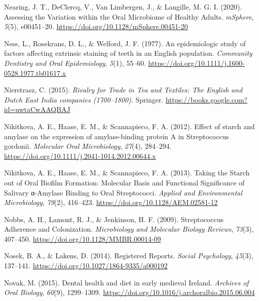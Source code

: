 \documentclass[
  letterpaper,
]{book}
\newlength{\cslhangindent}
\newlength{\cslentryspacingunit} %
\newenvironment{CSLReferences}[2] %
 {%
  \setlength{\parindent}{0pt}
  \ifodd #1
  \let\oldpar\par
  \def\par{\hangindent=\cslhangindent\oldpar}
  \fi
  \setlength{\parskip}{#2\cslentryspacingunit}
 }%
 {}
\begin{document}
\begin{CSLReferences}{1}{0}
\leavevmode{}%
Nearing, J. T., DeClercq, V., Van Limbergen, J., \& Langille, M. G. I.
(2020). Assessing the {Variation} within the {Oral Microbiome} of
{Healthy Adults}. \emph{mSphere}, \emph{5}(5), e00451--20.
\url{https://doi.org/10.1128/mSphere.00451-20}

\leavevmode{}%
Ness, L., Rosekrans, D. L., \& Welford, J. F. (1977). An epidemiologic
study of factors affecting extrinsic staining of teeth in an {English}
population. \emph{Community Dentistry and Oral Epidemiology},
\emph{5}(1), 55--60.
\url{https://doi.org/10.1111/j.1600-0528.1977.tb01617.x}

\leavevmode{}%
Nierstrasz, C. (2015). \emph{Rivalry for {Trade} in {Tea} and
{Textiles}: {The English} and {Dutch East India} companies
(1700--1800)}. {Springer}.
\url{https://books.google.com?id=uwtaCwAAQBAJ}

\leavevmode{}%
Nikitkova, A. E., Haase, E. M., \& Scannapieco, F. A. (2012). Effect of
starch and amylase on the expression of amylase-binding protein {A} in
{Streptococcus} gordonii. \emph{Molecular Oral Microbiology},
\emph{27}(4), 284--294.
\url{https://doi.org/10.1111/j.2041-1014.2012.00644.x}

\leavevmode{}%
Nikitkova, A. E., Haase, E. M., \& Scannapieco, F. A. (2013). Taking the
{Starch} out of {Oral Biofilm Formation}: {Molecular Basis} and
{Functional Significance} of {Salivary} α-{Amylase Binding} to {Oral
Streptococci}. \emph{Applied and Environmental Microbiology},
\emph{79}(2), 416--423. \url{https://doi.org/10.1128/AEM.02581-12}

\leavevmode{}%
Nobbs, A. H., Lamont, R. J., \& Jenkinson, H. F. (2009). Streptococcus
{Adherence} and {Colonization}. \emph{Microbiology and Molecular Biology
Reviews}, \emph{73}(3), 407--450.
\url{https://doi.org/10.1128/MMBR.00014-09}

\leavevmode{}%
Nosek, B. A., \& Lakens, D. (2014). Registered {Reports}. \emph{Social
Psychology}, \emph{45}(3), 137--141.
\url{https://doi.org/10.1027/1864-9335/a000192}

\leavevmode{}%
Novak, M. (2015). Dental health and diet in early medieval {Ireland}.
\emph{Archives of Oral Biology}, \emph{60}(9), 1299--1309.
\url{https://doi.org/10.1016/j.archoralbio.2015.06.004}


\end{CSLReferences}
\end{document}
